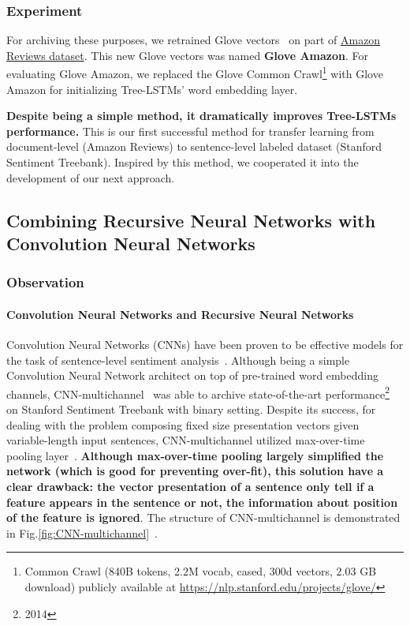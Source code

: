 \subsubsection{Experiment}
For archiving these purposes, we retrained Glove vectors~\cite{glove} on part of  \hyperref[sec:amazon]{Amazon Reviews dataset}.
This new Glove vectors was named \textbf{Glove Amazon}.
For evaluating Glove Amazon, we replaced the Glove Common Crawl\footnote{Common Crawl (840B tokens, 2.2M vocab, cased, 300d vectors, 2.03 GB download) publicly available at \url{https://nlp.stanford.edu/projects/glove/}} with Glove Amazon for initializing Tree-LSTMs' word embedding layer.

\textbf{Despite being a simple method, it dramatically improves Tree-LSTMs performance.}
This is our first successful method for transfer learning from document-level (Amazon Reviews) to sentence-level labeled dataset (Stanford Sentiment Treebank).
Inspired by this method, we cooperated it into the development of our next approach.

\subsection{Combining Recursive Neural Networks with Convolution Neural Networks}

\subsubsection{Observation}
\paragraph{Convolution Neural Networks and Recursive Neural Networks}
Convolution Neural Networks (CNNs) have been proven to be effective models for the task of sentence-level sentiment analysis~\cite{KimCNN}.
Although being a simple Convolution Neural Network architect on top of pre-trained word embedding channels, CNN-multichannel~\cite{KimCNN} was able to archive state-of-the-art performance\footnote{2014} on Stanford Sentiment Treebank with binary setting.
Despite its success, for dealing with the problem composing fixed size presentation vectors given variable-length input sentences, CNN-multichannel utilized max-over-time pooling layer~\cite{nlp-scratch}.
\textbf{Although max-over-time pooling largely simplified the network (which is good for preventing over-fit), this solution have a clear drawback: the vector presentation of a sentence only tell if a feature appears in the sentence or not, the information about position of the feature is ignored}.
The structure of CNN-multichannel is demonstrated in Fig.\ref{fig:CNN-multichannel}~\cite{KimCNN}.

